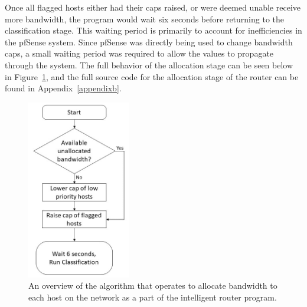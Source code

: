 Once all flagged hosts either had their caps raised, or were deemed unable receive more bandwidth, the program would wait six seconds before returning to the classification stage.
This waiting period is primarily to account for inefficiencies in the pfSense system.
Since pfSense was directly being used to change bandwidth caps, a small waiting period was required to allow the values to propagate through the system.
The full behavior of the allocation stage can be seen below in Figure~\ref{allocation}, and the full source code for the allocation stage of the router can be found in Appendix~\ref{appendixb}.
\begin{figure}[!ht]
    \centering
    \includegraphics[width=0.4\textwidth,keepaspectratio]{Images/Chpt4/Flowchart_Allocation_Updated.png}
    \caption{An overview of the algorithm that operates to allocate bandwidth to each host on the network as a part of the intelligent router program.}
    \label{allocation}
\end{figure}

